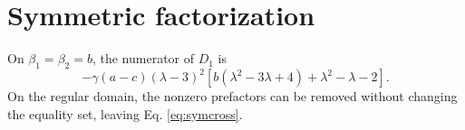 \section{Symmetric factorization}
On $\beta_1=\beta_2=b$, the numerator of $D_1$ is
\[
-\gamma(a-c)(\lambda-3)^2
\left[b(\lambda^2-3\lambda+4)+\lambda^2-\lambda-2\right].
\]
On the regular domain, the nonzero prefactors can be removed without changing the equality set, leaving Eq. \eqref{eq:symcross}.
